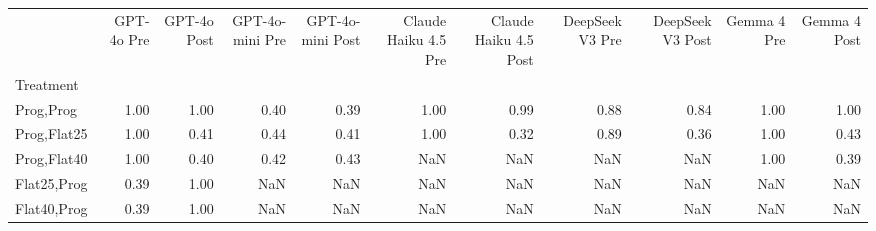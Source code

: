 \begin{tabular}{lrrrrrrrrrr}
\toprule
 & GPT-4o Pre & GPT-4o Post & GPT-4o-mini Pre & GPT-4o-mini Post & Claude Haiku 4.5 Pre & Claude Haiku 4.5 Post & DeepSeek V3 Pre & DeepSeek V3 Post & Gemma 4 Pre & Gemma 4 Post \\
Treatment &  &  &  &  &  &  &  &  &  &  \\
\midrule
Prog,Prog & 1.00 & 1.00 & 0.40 & 0.39 & 1.00 & 0.99 & 0.88 & 0.84 & 1.00 & 1.00 \\
Prog,Flat25 & 1.00 & 0.41 & 0.44 & 0.41 & 1.00 & 0.32 & 0.89 & 0.36 & 1.00 & 0.43 \\
Prog,Flat40 & 1.00 & 0.40 & 0.42 & 0.43 & NaN & NaN & NaN & NaN & 1.00 & 0.39 \\
Flat25,Prog & 0.39 & 1.00 & NaN & NaN & NaN & NaN & NaN & NaN & NaN & NaN \\
Flat40,Prog & 0.39 & 1.00 & NaN & NaN & NaN & NaN & NaN & NaN & NaN & NaN \\
\bottomrule
\end{tabular}
